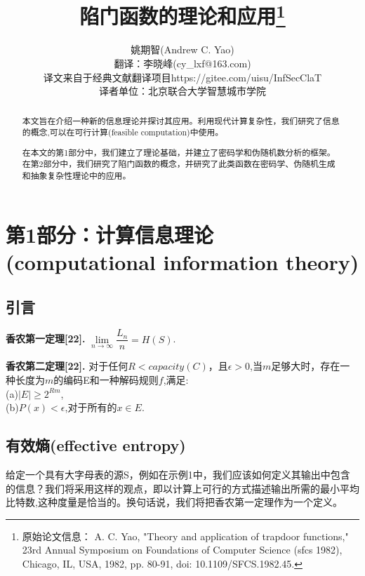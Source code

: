 \documentclass[]{article}
\title{陷门函数的理论和应用\footnote{原始论文信息： A. C. Yao, "Theory and application of trapdoor functions," 23rd Annual Symposium on Foundations of Computer Science (sfcs 1982), Chicago, IL, USA, 1982, pp. 80-91, doi: 10.1109/SFCS.1982.45.}}
\author{姚期智(Andrew C. Yao)\\
{\small  翻译：李晓峰(cy\_lxf@163.com)}\\
{\small  译文来自于经典文献翻译项目https://gitee.com/uisu/InfSecClaT}\\
{\small 译者单位：北京联合大学智慧城市学院}
}
\begin{document}
	
\maketitle

\begin{abstract}
	本文旨在介绍一种新的信息理论并探讨其应用。利用现代计算复杂性，我们研究了信息的概念,可以在可行计算(feasible computation)中使用。\par
	在本文的第1部分中，我们建立了理论基础，并建立了密码学和伪随机数分析的框架。在第2部分中，我们研究了陷门函数的概念，并研究了此类函数在密码学、伪随机生成和抽象复杂性理论中的应用。
\end{abstract}
\newpage
\tableofcontents
\newpage	
\section{第1部分：计算信息理论(computational information theory)}

\subsection{引言}


\vspace{0.5cm}
\textbf{香农第一定理[22].} $\lim\limits_{n\rightarrow \infty} \dfrac{L_n}{n}=H(S)$.\par
\vspace{0.5cm}


\vspace{0.5cm}
\textbf{香农第二定理[22].} 对于任何$R<capacity(C)$，且$\epsilon >0$,当$m$足够大时，存在一种长度为$m$的编码E和一种解码规则$f$,满足:\\
(a)$|E|\geq 2^{Rm}$,\\
(b)$P(x)<\epsilon$,对于所有的$x\in E$.\par
\vspace{0.5cm}

\subsection{有效熵(effective entropy)}
给定一个具有大字母表的源S，例如在示例1中，我们应该如何定义其输出中包含的信息？我们将采用这样的观点，即以计算上可行的方式描述输出所需的最小平均比特数,这种度量是恰当的。换句话说，我们将把香农第一定理作为一个定义。\par
\end{document}
